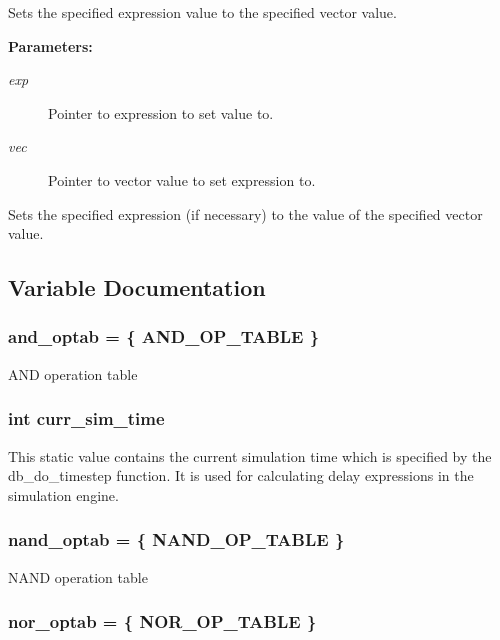 Sets the specified expression value to the specified vector value.

\begin{Desc}
\item[{\bf Parameters: }]\par
\begin{description}
\item[
{\em exp}]Pointer to expression to set value to. \item[
{\em vec}]Pointer to vector value to set expression to.

\end{description}
\end{Desc}
Sets the specified expression (if necessary) to the value of the specified vector value. 

\subsection{Variable Documentation}
\subsubsection{ and\_\-optab = \{ AND\_\-OP\_\-TABLE \}}\label{expr_8c_a1}


AND operation table 
\subsubsection{\setlength{\rightskip}{0pt plus 5cm}int curr\_\-sim\_\-time}\label{expr_8c_a6}


This static value contains the current simulation time which is specified by the db\_\-do\_\-timestep function. It is used for calculating delay expressions in the simulation engine. 
\subsubsection{ nand\_\-optab = \{ NAND\_\-OP\_\-TABLE \}}\label{expr_8c_a3}


NAND operation table 
\subsubsection{ nor\_\-optab = \{ NOR\_\-OP\_\-TABLE \}}\label{expr_8c_a4}


